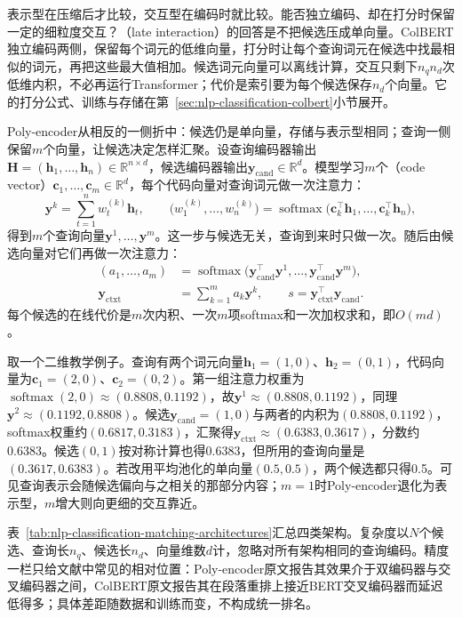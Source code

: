 表示型在压缩后才比较，交互型在编码时就比较。能否独立编码、却在打分时保留一定的细粒度交互？（late interaction）的回答是不把候选压成单向量。ColBERT独立编码两侧，保留每个词元的低维向量，打分时让每个查询词元在候选中找最相似的词元，再把这些最大值相加。候选词元向量可以离线计算，交互只剩下$n_qn_d$次低维内积，不必再运行Transformer；代价是索引要为每个候选保存$n_d$个向量。它的打分公式、训练与存储在第~\ref{sec:nlp-classification-colbert}小节展开。

Poly-encoder从相反的一侧折中：候选仍是单向量，存储与表示型相同；查询一侧保留$m$个向量，让候选决定怎样汇聚。设查询编码器输出$\bm H=(\bm h_1,\ldots,\bm h_n)\in\mathbb R^{n\times d}$，候选编码器输出$\bm y_{\mathrm{cand}}\in\mathbb R^d$。模型学习$m$个（code vector）$\bm c_1,\ldots,\bm c_m\in\mathbb R^d$，每个代码向量对查询词元做一次注意力：
\[
  \bm y^{k}=\sum_{t=1}^{n}w_{t}^{(k)}\bm h_t,\qquad
  \bigl(w_{1}^{(k)},\ldots,w_{n}^{(k)}\bigr)=
  \operatorname{softmax}\bigl(\bm c_k^\top\bm h_1,\ldots,\bm c_k^\top\bm h_n\bigr),
\]
得到$m$个查询向量$\bm y^1,\ldots,\bm y^m$。这一步与候选无关，查询到来时只做一次。随后由候选向量对它们再做一次注意力：
\[
  \begin{aligned}
    (a_1,\ldots,a_m)&=\operatorname{softmax}\bigl(\bm y_{\mathrm{cand}}^\top\bm y^1,\ldots,\bm y_{\mathrm{cand}}^\top\bm y^m\bigr),\\
    \bm y_{\mathrm{ctxt}}&=\sum_{k=1}^{m}a_k\bm y^{k},\qquad
    s=\bm y_{\mathrm{ctxt}}^\top\bm y_{\mathrm{cand}}.
  \end{aligned}
\]
每个候选的在线代价是$m$次内积、一次$m$项softmax和一次加权求和，即$O(md)$。

取一个二维教学例子。查询有两个词元向量$\bm h_1=(1,0)$、$\bm h_2=(0,1)$，代码向量为$\bm c_1=(2,0)$、$\bm c_2=(0,2)$。第一组注意力权重为$\operatorname{softmax}(2,0)\approx(0.8808,0.1192)$，故$\bm y^1\approx(0.8808,0.1192)$，同理$\bm y^2\approx(0.1192,0.8808)$。候选$\bm y_{\mathrm{cand}}=(1,0)$与两者的内积为$(0.8808,0.1192)$，softmax权重约$(0.6817,0.3183)$，汇聚得$\bm y_{\mathrm{ctxt}}\approx(0.6383,0.3617)$，分数约0.6383。候选$(0,1)$按对称计算也得0.6383，但所用的查询向量是$(0.3617,0.6383)$。若改用平均池化的单向量$(0.5,0.5)$，两个候选都只得0.5。可见查询表示会随候选偏向与之相关的那部分内容；$m=1$时Poly-encoder退化为表示型，$m$增大则向更细的交互靠近。

表~\ref{tab:nlp-classification-matching-architectures}汇总四类架构。复杂度以$N$个候选、查询长$n_q$、候选长$n_d$、向量维数$d$计，忽略对所有架构相同的查询编码。精度一栏只给文献中常见的相对位置：Poly-encoder原文报告其效果介于双编码器与交叉编码器之间，ColBERT原文报告其在段落重排上接近BERT交叉编码器而延迟低得多；具体差距随数据和训练而变，不构成统一排名。

